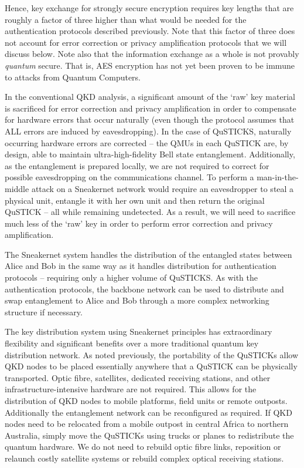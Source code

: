 \documentclass[twocolumn, aps, rmp, amsmath, amssymb, nofootinbib, superscriptaddress, longbibliography, floatfix, table-of-contents, eqsecnum]{revtex4-2}
\begin{document}
Hence, key exchange for strongly secure encryption requires key lengths that are roughly a factor of three higher than what would be needed for the authentication protocols described previously. Note that this factor of three does not account for error correction or privacy amplification protocols that we will discuss below. Note also that the information exchange as a whole is not provably \textit{quantum} secure. That is, AES encryption has not yet been proven to be immune to attacks from Quantum Computers.

In the conventional QKD analysis, a significant amount of the `raw' key material is sacrificed for error correction and privacy amplification in order to compensate for hardware errors that occur naturally (even though the protocol assumes that ALL errors are induced by eavesdropping). In the case of QuSTICKS, naturally occurring hardware errors are corrected -- the QMUs in each QuSTICK are, by design, able to maintain ultra-high-fidelity Bell state entanglement. Additionally, as the entanglement is prepared locally, we are not required to correct for possible eavesdropping on the communications channel. To perform a man-in-the-middle attack on a Sneakernet network would require an eavesdropper to steal a physical unit, entangle it with her own unit and then return the original QuSTICK -- all while remaining undetected. As a result, we will need to sacrifice much less of the `raw' key in order to perform error correction and privacy amplification. 

The Sneakernet system handles the distribution of the entangled states between Alice and Bob in the same way as it handles distribution for authentication protocols -- requiring only a higher volume of QuSTICKS. As with the authentication protocols, the backbone network can be used to distribute and swap entanglement to Alice and Bob through a more complex networking structure if necessary. 

The key distribution system using Sneakernet principles has extraordinary flexibility and significant benefits over a more traditional quantum key distribution network. As noted previously, the portability of the QuSTICKs allow QKD nodes to be placed essentially anywhere that a QuSTICK can be physically transported. Optic fibre, satellites,  dedicated receiving stations, and other infrastructure-intensive hardware are not required. This allows for the distribution of QKD nodes to mobile platforms, field units or remote outposts. Additionally the entanglement network can be reconfigured as required. If QKD nodes need to be relocated from a mobile outpost in central Africa to northern Australia, simply move the QuSTICKs using trucks or planes to redistribute the quantum hardware. We do not need to rebuild optic fibre links, reposition or relaunch costly satellite systems or rebuild complex optical receiving stations. 
\end{document}

